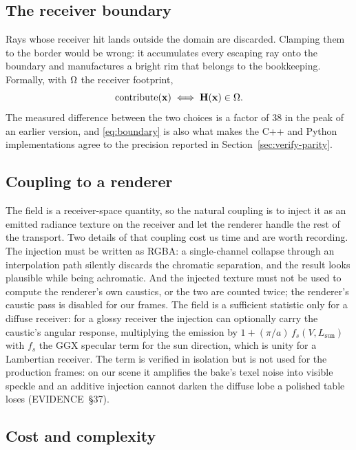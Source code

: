 \subsection{The receiver boundary}
\label{sec:ours-boundary}

Rays whose receiver hit lands outside the domain are discarded. Clamping them to the border would be wrong: it accumulates every escaping ray onto the boundary and manufactures a bright rim that belongs to the bookkeeping. Formally, with $\Omega$ the receiver footprint,
\begin{equation}
\text{contribute}(\mathbf{x}) \iff \mathbf{H}(\mathbf{x}) \in \Omega .
\label{eq:boundary}
\end{equation}
The measured difference between the two choices is a factor of \num{38} in the
peak of an earlier version, and \eqref{eq:boundary} is also what makes the C++
and Python implementations agree to the precision reported in
Section~\ref{sec:verify-parity}.

\subsection{Coupling to a renderer}
\label{sec:ours-coupling}

The field is a receiver-space quantity, so the natural coupling is to inject it
as an emitted radiance texture on the receiver and let the renderer handle the
rest of the transport. Two details of that coupling cost us time and are worth
recording. The injection must be written as RGBA: a single-channel collapse
through an interpolation path silently discards the chromatic separation, and
the result looks plausible while being achromatic. And the injected texture must
not be used to compute the renderer's own caustics, or the two are counted
twice; the renderer's caustic pass is disabled for our frames. The field is a
sufficient statistic only for a diffuse receiver: for a glossy receiver the
injection can optionally carry the caustic's angular response, multiplying the
emission by $1 + (\pi/a)\,f_s(V, L_{\mathrm{sun}})$ with $f_s$ the GGX
specular term for the sun direction, which is unity for a Lambertian receiver.
The term is verified in isolation but is not used for the production frames:
on our scene it amplifies the bake's texel noise into visible speckle and an
additive injection cannot darken the diffuse lobe a polished table loses
(EVIDENCE~\S37).

\subsection{Cost and complexity}
\label{sec:ours-cost}

